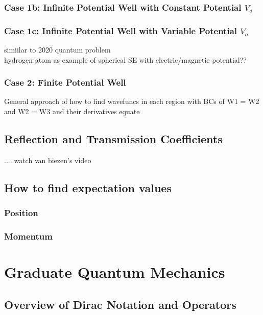 \documentclass[]{article}
\begin{document}
\subsubsection{Case 1b: Infinite Potential Well with Constant Potential $V_{o}$}
\subsubsection{Case 1c: Infinite Potential Well with Variable Potential $V_{o}$}
simiilar to 2020 quantum problem\\
hydrogen atom as example of spherical SE with electric/magnetic potential??
\subsubsection{Case 2: Finite Potential Well}
General approach of how to find wavefuncs in each region with BCs of W1 = W2 and W2 = W3 and their derivatives equate

\subsection{Reflection and Transmission Coefficients}
.....watch van biezen's video

\subsection{How to find expectation values}
\subsubsection{Position}
\subsubsection{Momentum}

\pagebreak
\section{Graduate Quantum Mechanics}
\subsection{Overview of Dirac Notation and Operators}
\end{document}
